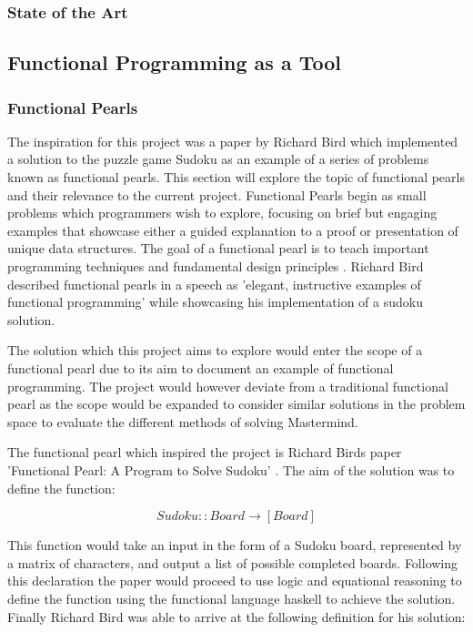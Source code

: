 \documentclass[11pt]{article}  %
\theoremstyle{definition}
\theoremstyle{remark}
\begin{document}
\subsubsection {State of the Art}


\subsection {Functional Programming as a Tool}

\subsubsection {Functional Pearls}
The inspiration for this project was a paper by Richard Bird which implemented a solution to the puzzle game Sudoku as an example of a series of problems known as functional pearls. This section will explore the topic of functional pearls and their relevance to the current project. Functional Pearls begin as small problems which programmers wish to explore, focusing on brief but engaging examples that showcase either a guided explanation to a proof or presentation of unique data structures. The goal of a functional pearl is to teach important programming techniques and fundamental design principles \cite{Pearls}. Richard Bird described functional pearls in a speech as 'elegant, instructive examples of functional programming' while showcasing his implementation of a sudoku solution\cite {R. Bird Speech}.


The solution which this project aims to explore would enter the scope of a functional pearl due to its aim to document an example of functional programming. The project would however deviate from a traditional functional pearl as the scope would be expanded to consider similar solutions in the problem space to evaluate the different methods of solving Mastermind.

The functional pearl which inspired the project is Richard Birds paper 'Functional Pearl: A Program to Solve Sudoku' \cite{Sudoku}. The aim of the solution was to define the function:

\[ Sudoku :: Board \rightarrow [Board]\]

This function would take an input in the form of a Sudoku board, represented by a matrix of characters, and output a list of possible completed boards. Following this declaration the paper would proceed to use logic and equational reasoning to define the function using the functional language haskell to achieve the solution. Finally Richard Bird was able to arrive at the following definition for his solution:
\end{document}
